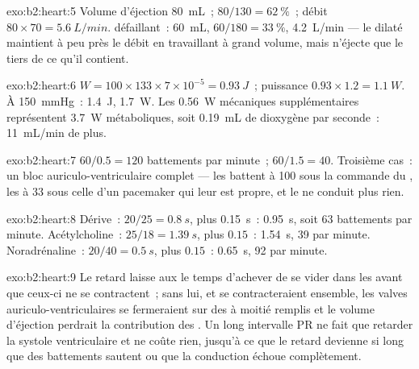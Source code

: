 \begin{solution}{exo:b2:heart:5}
Volume d'éjection \qty{80}{mL}~; 
$80/130 = \qty{62}{\%}$~; débit $80\times 70 = \qty{5.6}{L/min}$. 
défaillant~: \qty{60}{mL}, $60/180 = \qty{33}{\%}$, \qty{4.2}{L/min} ---
le  dilaté maintient à peu près le débit en travaillant à grand
volume, mais n'éjecte que le tiers de ce qu'il contient.
\end{solution}

\begin{solution}{exo:b2:heart:6}
$W = 100\times 133\times 7\times 10^{-5} = \qty{0.93}{J}$~; puissance
$0.93\times 1.2 = \qty{1.1}{W}$. À \qty{150}{mmHg}~: \qty{1.4}{J},
\qty{1.7}{W}. Les \qty{0.56}{W} mécaniques supplémentaires représentent
\qty{3.7}{W} métaboliques, soit \qty{0.19}{mL} de dioxygène par
seconde~: \qty{11}{mL/min} de plus.
\end{solution}

\begin{solution}{exo:b2:heart:7}
$60/0.5 = 120$ battements par minute~; $60/1.5 = 40$. Troisième cas~: un
bloc auriculo-ventriculaire complet --- les  battent à 100 sous
la commande du , les  à 33 sous celle d'un
pacemaker qui leur est propre, et le  ne conduit
plus rien.
\end{solution}

\begin{solution}{exo:b2:heart:8}
Dérive~: $20/25 = \qty{0.8}{s}$, plus \qty{0.15}{s}~: \qty{0.95}{s}, soit
63 battements par minute. Acétylcholine~: $25/18 = \qty{1.39}{s}$, plus
$0.15$~: \qty{1.54}{s}, 39 par minute. Noradrénaline~:
$20/40 = \qty{0.5}{s}$, plus $0.15$~: \qty{0.65}{s}, 92 par minute.
\end{solution}

\begin{solution}{exo:b2:heart:9}
Le retard laisse aux  le temps d'achever de se vider dans les
 avant que ceux-ci ne se contractent~; sans lui, 
et  se contracteraient ensemble, les valves
auriculo-ventriculaires se fermeraient sur des  à moitié
remplis et le volume d'éjection perdrait la contribution des
. Un long intervalle PR ne fait que retarder la systole
ventriculaire et ne coûte rien, jusqu'à ce que le retard devienne si
long que des battements sautent ou que la conduction échoue
complètement.
\end{solution}

